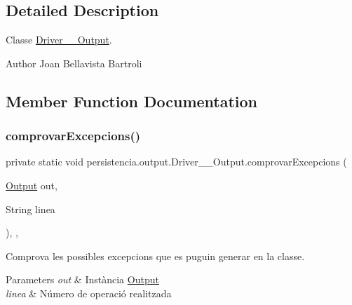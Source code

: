 \subsection{Detailed Description}
Classe \hyperlink{classpersistencia_1_1output_1_1Driver____Output}{Driver\+\_\+\+\_\+\+Output}. 

\begin{DoxyAuthor}{Author}
Joan Bellavista Bartroli 
\end{DoxyAuthor}


\subsection{Member Function Documentation}
\mbox{\label{classpersistencia_1_1output_1_1Driver____Output_a88243f6a932e15c580fcbcc31a21b9bc}} 
\subsubsection{\texorpdfstring{comprovar\+Excepcions()}{comprovarExcepcions()}}
{\footnotesize\ttfamily private static void persistencia.\+output.\+Driver\+\_\+\+\_\+\+Output.\+comprovar\+Excepcions (\begin{DoxyParamCaption}\item[{\hyperlink{classpersistencia_1_1output_1_1Output}{Output}}]{out,  }\item[{String}]{linea }\end{DoxyParamCaption})\hspace{0.3cm}{\ttfamily [inline]}, {\ttfamily [static]}, {\ttfamily [private]}}



Comprova les possibles excepcions que es puguin generar en la classe. 


\begin{DoxyParams}{Parameters}
{\em out} & Instància \hyperlink{classpersistencia_1_1output_1_1Output}{Output} \\
\hline
{\em linea} & Número de operació realitzada \\
\hline
\end{DoxyParams}
\mbox{\label{classpersistencia_1_1output_1_1Driver____Output_a1fcfdd813a7c5460772e74b5709fc030}} 
